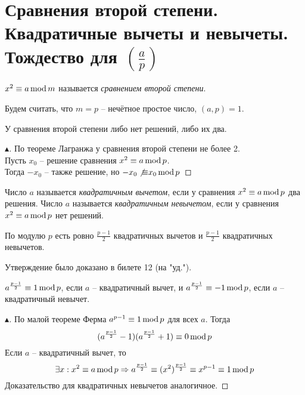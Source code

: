 \setcounter{section}{50}
\section{Сравнения второй степени. Квадратичные вычеты и невычеты. Тождество для $\left(\frac{a}{p}\right)$}

\begin{definition}
    $x^2 \equiv a \operatorname{mod}{m}$ называется \textit{сравнением второй степени}.
\end{definition}
Будем считать, что $m = p$ -- нечётное простое число, $(a, p) = 1$.
\begin{note}
    У сравнения второй степени либо нет решений, либо их два.
    \begin{proof}[$\blacktriangle$]
        По теореме Лагранжа у сравнения второй степени не более 2.\\
        Пусть $x_0$ -- решение сравнения $x^2 \equiv a \operatorname{mod}{p}$.\\
        Тогда $-x_0$ -- также решение, но $-x_0 \not{\equiv} x_0 \operatorname{mod}{p}$
    \end{proof}
\end{note}

\begin{definition}
    Число $a$ называется \textit{квадратичным вычетом}, если у сравнения $x^2 \equiv a \operatorname{mod}{p}$ два решения.
    Число $a$ называется \textit{квадратичным невычетом}, если у сравнения $x^2 \equiv a \operatorname{mod}{p}$ нет решений.
\end{definition}

\begin{proposition}
    По модулю $p$ есть ровно $\frac{p - 1}{2}$ квадратичных вычетов и $\frac{p - 1}{2}$ квадратичных невычетов.
\end{proposition}

    Утверждение было доказано в билете 12 (на "уд.").

\begin{theorem}
     $a^{ \frac{p - 1}{2} } \equiv 1 \operatorname{mod}{p}$, если $a$ -- квадратичный вычет, и $a^{ \frac{p - 1}{2} } \equiv -1 \operatorname{mod}{p}$, если $a$ -- квадратичный невычет.
    \begin{proof}[$\blacktriangle$]
        По малой теореме Ферма $a^{p-1} \equiv 1 \operatorname{mod}{p}$ для всех $a$. Тогда
        $$
            (a^{ \frac{p - 1}{2} } - 1)(a^{ \frac{p - 1}{2} } + 1) \equiv 0 \operatorname{mod}{p}
        $$
        Если $a$ -- квадратичный вычет, то 
        $$
        \exists x : x^2 \equiv a \operatorname{mod}{p} \Rightarrow a^{ \frac{p - 1}{2} } \equiv (x^2)^{ \frac{p - 1}{2} } \equiv x^{p - 1} \equiv 1 \operatorname{mod}{p}
        $$
        Доказательство для квадратичных невычетов аналогичное.
    \end{proof}
\end{theorem}

